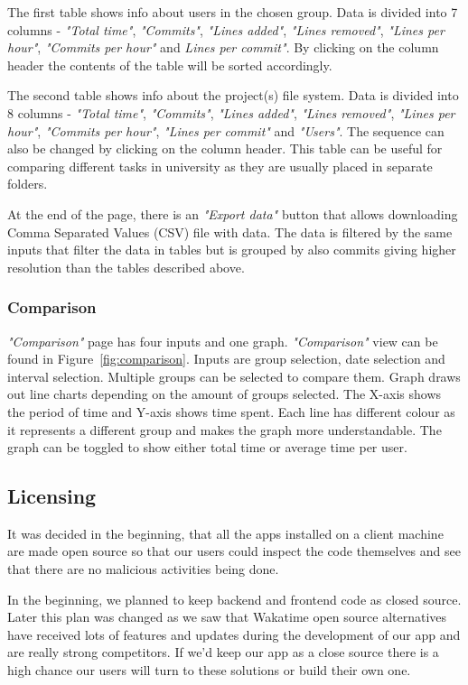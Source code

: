 The first table shows info about users in the chosen group.
Data is divided into 7 columns - \textit{"Total time"}, \textit{"Commits"}, \textit{"Lines added"}, \textit{"Lines removed"},
\textit{"Lines per hour"}, \textit{"Commits per hour"} and \textit{Lines per commit"}.
By clicking on the column header the contents of the table will be sorted accordingly.

The second table shows info about the project(s) file system.
Data is divided into 8 columns - \textit{"Total time"}, \textit{"Commits"}, \textit{"Lines added"}, \textit{"Lines removed"},
\textit{"Lines per hour"}, \textit{"Commits per hour"}, \textit{"Lines per commit"} and \textit{"Users"}.
The sequence can also be changed by clicking on the column header.
This table can be useful for comparing different tasks in university as they are usually placed in separate folders.

At the end of the page, there is an \textit{"Export data"} button that allows downloading Comma Separated Values (CSV) file with data.
The data is filtered by the same inputs that filter the data in tables but is grouped
by also commits giving higher resolution than the tables described above.


\subsubsection{Comparison}\label{subsubsec:comparison}
\textit{"Comparison"} page has four inputs and one graph.
\textit{"Comparison"} view can be found in Figure~\ref{fig:comparison}.
Inputs are group selection, date selection and interval selection.
Multiple groups can be selected to compare them.
Graph draws out line charts depending on the amount of groups selected.
The X-axis shows the period of time and Y-axis shows time spent.
Each line has different colour as it represents a different group and makes the graph more understandable.
The graph can be toggled to show either total time or average time per user.

\subsection{Licensing}\label{subsec:licencing}
It was decided in the beginning, that all the apps installed on a client machine are made open source so that
our users could inspect the code themselves and see that there are no malicious activities being done.

In the beginning, we planned to keep backend and frontend code as closed source.
Later this plan was changed as we saw that Wakatime open source alternatives have received lots of features and updates
during the development of our app and are really strong competitors.
If we'd keep our app as a close source there is a high chance our users will turn to these solutions or build their own one.

